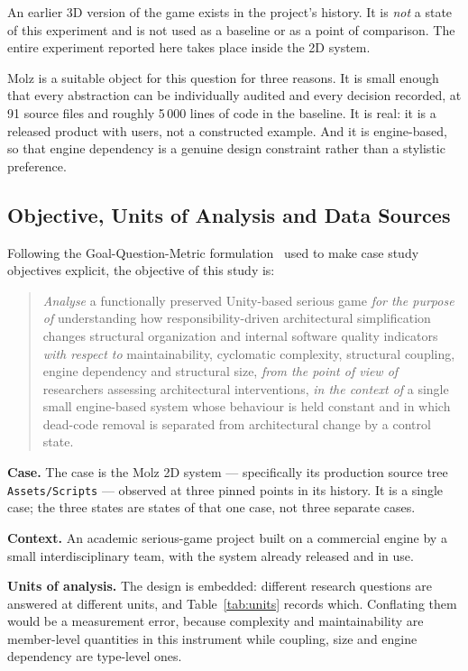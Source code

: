 \documentclass[pdflatex,sn-basic]{sn-jnl}
\begin{document}
An earlier 3D version of the game exists in the project's history. It is \emph{not} a state of this experiment and is not used as a baseline or as a point of comparison. The entire experiment reported here takes place inside the 2D system.

Molz is a suitable object for this question for three reasons. It is small enough that every abstraction can be individually audited and every decision recorded, at 91 source files and roughly 5\,000 lines of code in the baseline. It is real: it is a released product with users, not a constructed example. And it is engine-based, so that engine dependency is a genuine design constraint rather than a stylistic preference.

\subsection{Objective, Units of Analysis and Data Sources}

Following the Goal-Question-Metric formulation~\citep{basili1994} used to make case study objectives explicit, the objective of this study is:

\begin{quote}
\emph{Analyse} a functionally preserved Unity-based serious game \emph{for the purpose of} understanding how responsibility-driven architectural simplification changes structural organization and internal software quality indicators \emph{with respect to} maintainability, cyclomatic complexity, structural coupling, engine dependency and structural size, \emph{from the point of view of} researchers assessing architectural interventions, \emph{in the context of} a single small engine-based system whose behaviour is held constant and in which dead-code removal is separated from architectural change by a control state.
\end{quote}

\textbf{Case.} The case is the Molz 2D system --- specifically its production source tree \texttt{Assets/Scripts} --- observed at three pinned points in its history. It is a single case; the three states are states of that one case, not three separate cases.

\textbf{Context.} An academic serious-game project built on a commercial engine by a small interdisciplinary team, with the system already released and in use.

\textbf{Units of analysis.} The design is embedded: different research questions are answered at different units, and Table~\ref{tab:units} records which. Conflating them would be a measurement error, because complexity and maintainability are member-level quantities in this instrument while coupling, size and engine dependency are type-level ones.
\end{document}

